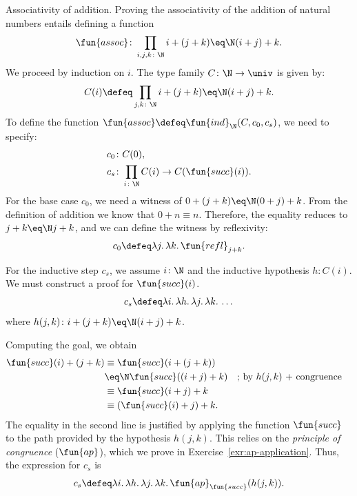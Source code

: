 \begin{lpar}{Associativity of addition.}\label{lpar:associativity-of-addition}
    Proving the associativity of the addition of natural numbers entails defining a function
    \[
        \fun{assoc}\colon\prod_{i,j,k\colon\N}i+(j+k)\eq\N(i+j)+k.
    \]
    We proceed by induction on $i$. The type family $C\colon\N\to\univ$ is given by:
    \[
        C(i) \defeq \prod_{j,k\colon\N} i+(j+k)\eq\N(i+j)+k.
    \]
    To define the function $\fun{assoc} \defeq \fun{ind}_\N(C, c_0, c_s)$, we need to specify:
    \begin{align*}
        c_0 &\colon C(0),\\
        c_s &\colon \prod_{i\colon\N} C(i) \to C(\fun{succ}(i)).
    \end{align*}
    For the base case $c_0$, we need a witness of $0+(j+k)\eq\N(0+j)+k$. From the definition of addition we know that $0+n \equiv n$. Therefore, the equality reduces to $j+k\eq\N j+k$, and we can define the witness by reflexivity:
    \[
        c_0 \defeq \lambda j.\, \lambda k.\, \fun{refl}_{j+k}.
    \]
    
    For the inductive step $c_s$, we assume $i\colon\N$ and the inductive hypothesis $h\colon C(i)$. We must construct a proof for $\fun{succ}(i)$.
    \[
        c_s\defeq\lambda i.\,\lambda h.\,\lambda j.\,\lambda k.\,\dots
    \]
    where $h(j,k)\colon i+(j+k)\eq\N(i+j)+k$.
    
    Computing the goal, we obtain
    \begin{align*}
        \fun{succ}(i)+(j+k) &\equiv \fun{succ}(i+(j+k))\\
            &\eq\N \fun{succ}((i+j)+k) && \text{; by $h(j,k)$ + congruence}\\
            &\equiv \fun{succ}(i+j)+k\\
            &\equiv (\fun{succ}(i)+j)+k.
    \end{align*}
    The equality in the second line is justified by applying the function $\fun{succ}$ to the path provided by the hypothesis $h(j,k)$. This relies on the \textit{principle of congruence} ($\fun{ap}$), which we prove in Exercise~\ref{exr:ap-application}. Thus, the expression for $c_s$ is
    \[
        c_s\defeq\lambda i.\,\lambda h.\,\lambda j.\,\lambda k.\,
            \fun{ap}_{\fun{succ}}(h(j,k)).
    \]
\end{lpar}

